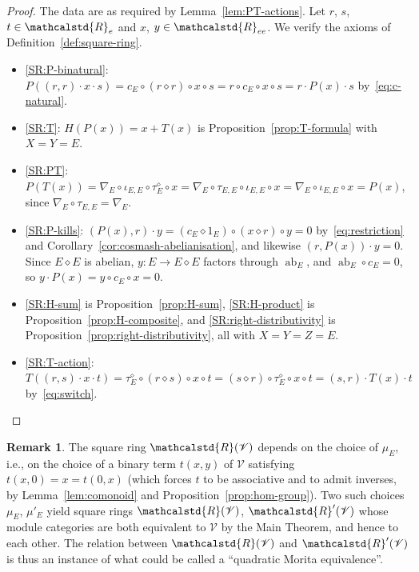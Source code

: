 \documentclass[reqno,a4paper]{amsart}
\theoremstyle{plain}
\theoremstyle{definition}
\newtheorem{remark}[subsection]{Remark}
\newcommand{\V}{\ensuremath{\mathcal{V}}}
\newcommand{\R}{\ensuremath{\mathcalstd{R}}}
\DeclareMathOperator{\ab}{ab}
\newcommand{\cosmash}{\ensuremath{\diamond}}
\newcommand{\cc}[1]{\ensuremath{c_{#1}}}                    %
\newcommand{\tw}[2]{\ensuremath{\tau_{#1,#2}}}             %
\newcommand{\swc}[1]{\ensuremath{\tau^{\cosmash}_{#1}}}          %
\newcommand{\fold}[1]{\ensuremath{\nabla_{#1}}}            %
\renewcommand{\Re}{\ensuremath{\R_{e}}}
\newcommand{\Ree}{\ensuremath{\R_{ee}}}
\begin{document}
\begin{proof}
  The data are as required by Lemma~\ref{lem:PT-actions}. Let \(r\), \(s\), \(t\in\Re\) and \(x\), \(y\in\Ree\). We verify the axioms of Definition~\ref{def:square-ring}.
  \begin{itemize}
    \item \ref{SR:P-binatural}: \(P((r,r)\cdot x\cdot s)=\cc{E}\circ(r\cosmash r)\circ x\circ s=r\circ\cc{E}\circ x\circ s=r\cdot P(x)\cdot s\) by~\eqref{eq:c-natural}.
    \item \ref{SR:T}: \(H(P(x))=x+T(x)\) is Proposition~\ref{prop:T-formula} with \(X=Y=E\).
    \item \ref{SR:PT}: \(P(T(x))=\fold{E}\circ\iota_{E,E}\circ\swc{E}\circ x=\fold{E}\circ\tw{E}{E}\circ\iota_{E,E}\circ x=\fold{E}\circ\iota_{E,E}\circ x=P(x)\), since \(\fold{E}\circ\tw{E}{E}=\fold{E}\).
    \item \ref{SR:P-kills}: \((P(x),r)\cdot y=(\cc{E}\cosmash 1_{E})\circ(x\cosmash r)\circ y=0\) by~\eqref{eq:restriction} and Corollary~\ref{cor:cosmash-abelianisation}, and likewise \((r,P(x))\cdot y=0\). Since \(E\cosmash E\) is abelian, \(y\colon E\to E\cosmash E\) factors through \(\ab_{E}\), and \(\ab_{E}\circ\cc{E}=0\), so \(y\cdot P(x)=y\circ\cc{E}\circ x=0\).
    \item \ref{SR:H-sum} is Proposition~\ref{prop:H-sum}, \ref{SR:H-product} is Proposition~\ref{prop:H-composite}, and \ref{SR:right-distributivity} is Proposition~\ref{prop:right-distributivity}, all with \(X=Y=Z=E\).
    \item \ref{SR:T-action}: \(T((r,s)\cdot x\cdot t)=\swc{E}\circ(r\cosmash s)\circ x\circ t=(s\cosmash r)\circ\swc{E}\circ x\circ t=(s,r)\cdot T(x)\cdot t\) by~\eqref{eq:switch}.\qedhere
  \end{itemize}
\end{proof}

\begin{remark}\label{rem:choice-of-mu}
  The square ring \(\R(\V)\) depends on the choice of \(\mu_{E}\), i.e., on the choice of a binary term \(t(x,y)\) of \(\V\) satisfying \(t(x,0)=x=t(0,x)\) (which forces \(t\) to be associative and to admit inverses, by Lemma~\ref{lem:comonoid} and Proposition~\ref{prop:hom-group}). Two such choices \(\mu_{E}\), \(\mu'_{E}\) yield square rings \(\R(\V)\), \(\R'(\V)\) whose module categories are both equivalent to \(\V\) by the Main Theorem, and hence to each other. The relation between \(\R(\V)\) and \(\R'(\V)\) is thus an instance of what could be called a ``quadratic Morita equivalence''.
\end{remark}
\end{document}

